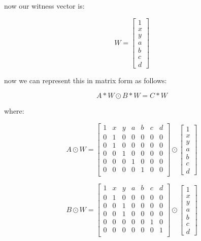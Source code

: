 \documentclass{article}
\begin{document}
now our witness vector is:

\[
W = \begin{bmatrix}
    1 \\ x \\ y \\ a \\ b \\ c \\ d
\end{bmatrix}
\]

now we can represent this in matrix form as follows:

\[
A*W \odot B*W = C*W
\]

where:

\[
A \odot W = \begin{bmatrix}
    1 & x & y & a & b & c & d\\
    0 & 1 & 0 & 0 & 0 & 0 & 0\\
    0 & 1 & 0 & 0 & 0 & 0 & 0\\
    0 & 0 & 1 & 0 & 0 & 0 & 0\\
    0 & 0 & 0 & 1 & 0 & 0 & 0\\
    0 & 0 & 0 & 0 & 1 & 0 & 0\\
\end{bmatrix} \odot \begin{bmatrix}
    1 \\ x \\ y \\ a \\ b \\ c \\ d
\end{bmatrix}
\] 


\[
B \odot W = \begin{bmatrix}
    1 & x & y & a & b & c & d\\
    0 & 1 & 0 & 0 & 0 & 0 & 0\\
    0 & 0 & 1 & 0 & 0 & 0 & 0\\
    0 & 0 & 1 & 0 & 0 & 0 & 0\\
    0 & 0 & 0 & 0 & 0 & 1 & 0\\
    0 & 0 & 0 & 0 & 0 & 0 & 1\\
\end{bmatrix} \odot \begin{bmatrix}
    1 \\ x \\ y \\ a \\ b \\ c \\ d
\end{bmatrix}
\]
\end{document}
